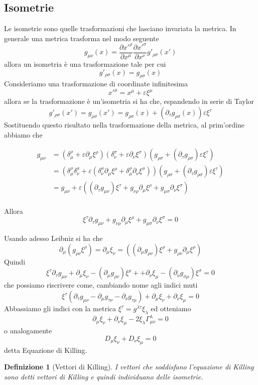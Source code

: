 \documentclass[10pt,a4paper]{article}
\theoremstyle{break}
\newtheorem{defn}{Definizione}
\theoremstyle{remark}
\theoremstyle{definition}
\begin{document}
\subsection{Isometrie}
Le isometrie sono quelle trasformazioni che lasciano invariata la metrica. In generale una metrica trasforma nel modo seguente
\[
g_{\mu \nu}(x) = \frac{\partial x'^\rho}{\partial x^\mu} \frac{\partial x'^\sigma}{\partial x^\nu} g'_{\rho \sigma}(x')
\]
allora un isometria è una trasformazione tale per cui
\[
g'_{\rho \sigma}(x) = g_{\rho \sigma}(x)
\]
Consideriamo una trasformazione di coordinate infinitesima 
\[
x'^\mu = x^\mu + \varepsilon \xi^\mu
\]
allora se la trasformazione è un'isometria si ha che, espandendo in serie di Taylor
\[
g'_{\rho \sigma}(x') = g_{\rho \sigma}(x') = g_{\rho \sigma}(x) + (\partial_\tau g_{\rho \sigma}(x) )\varepsilon \xi^\tau
\]
Sostituendo questo risultato nella trasformazione della metrica, al prim'ordine abbiamo che

\begin{align*}
	g_{\mu \nu} &= (\delta^\rho_\mu + \varepsilon\partial_\mu\xi^\rho) (\delta^\sigma_\nu + \varepsilon\partial_\nu\xi^\sigma)(g_{\rho \sigma} + (\partial_\tau g_{\rho \sigma} )\varepsilon \xi^\tau) \\
	&= (\delta^\rho_\mu \delta^\sigma_\nu + \varepsilon(\delta^\sigma_\nu\partial_\mu\xi^\rho + \delta^\rho_\mu \partial_\nu \xi^\sigma ))(g_{\rho \sigma} + (\partial_\tau g_{\rho \sigma})\varepsilon\xi^\tau) \\
	&= g_{\mu \nu} + \varepsilon((\partial_\tau g_{\mu \nu})\xi^\tau + g_{\nu \rho}\partial_\mu\xi^\rho + g_{\mu \sigma}\partial_\nu\xi^\sigma ) \\
\end{align*}

Allora
\[
\xi^\tau\partial_\tau g_{\mu \nu}  + g_{\nu \rho}\partial_\mu\xi^\rho + g_{\mu \sigma}\partial_\nu\xi^\sigma = 0
\]

Usando adesso Leibniz si ha che
\[
\partial_\mu(g_{\rho \nu}\xi^\rho) = \partial_\mu \xi_\nu = ((\partial_\mu g_{\rho \nu})\xi^\rho + g_{\rho \nu}\partial_\mu\xi^\rho)
\]
Quindi
\[
\xi^\tau\partial_\tau g_{\mu \nu} + \partial_\mu \xi_\nu - (\partial_\mu g_{\rho \nu})\xi^\rho +  + \partial_\nu \xi_\mu - (\partial_\nu g_{\sigma \mu})\xi^\sigma = 0 
\]
che possiamo riscrivere come, cambiando nome agli indici muti
\[
\xi^\tau(\partial_\tau g_{\mu \nu} - \partial_\mu g_{\tau \nu} - \partial_\nu g_{\tau \mu}) + \partial_\mu \xi_\nu + \partial_\nu \xi_\mu = 0
\]
Abbassiamo gli indici con la metrica $\xi^\tau = g^{\lambda \tau} \xi_\lambda$ ed otteniamo
\[
\partial_\mu \xi_\nu + \partial_\nu \xi_\mu - 2 \xi_\lambda \Gamma^\lambda_{\mu \nu} = 0
\]
o analogamente
\[
\boxed{
D_\mu \xi_\nu + D_\nu \xi_\mu = 0
}
\]
detta Equazione di Killing.
\begin{defn}[Vettori di Killing]
	I vettori che soddisfano l'equazione di Killing sono detti vettori di Killing e quindi individuano delle isometrie.
\end{defn}
\end{document}
